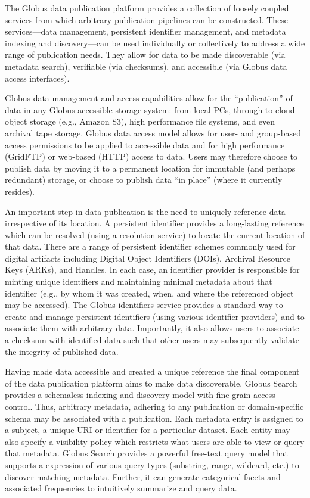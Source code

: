 \documentclass{aip-cp}
\begin{document}
The Globus data publication platform provides a collection of loosely
coupled services from which arbitrary publication pipelines can be constructed. 
These services---data management, persistent identifier management, and 
metadata indexing and discovery---can be used individually or collectively
to address a wide range of publication needs. They allow for data
to be made discoverable (via metadata search), verifiable (via checksums), 
and accessible (via Globus data access interfaces).

Globus data management and access capabilities allow for the 
``publication'' of data in any Globus-accessible storage system: 
from local PCs, through to cloud object storage (e.g., Amazon S3), high performance
file systems, and even archival tape storage. Globus data
access model allows for user- and group-based access permissions
to be applied to accessible data and for high performance (GridFTP)
or web-based (HTTP) access to data. 
Users may therefore
choose to publish data by moving it to a permanent location for 
immutable (and perhaps redundant) storage, or choose to publish 
data ``in place'' (where it currently resides). 

An important step in data publication is the need to uniquely
reference data irrespective of its location. A persistent
identifier provides a long-lasting reference which can be 
resolved (using a resolution service) to locate the current location
of that data. There are a range of persistent identifier schemes
commonly used for digital artifacts including Digital Object
Identifiers (DOIs), Archival Resource Keys (ARKs), and Handles. 
In each case, an identifier provider is responsible for minting
unique identifiers and maintaining minimal metadata about that 
identifier (e.g., by whom it was created, when, and where 
the referenced object may be accessed). The Globus identifiers
service provides a standard way to create and manage persistent
identifiers (using various identifier providers) 
and to associate them with arbitrary data. Importantly, it also
allows users to associate a checksum with identified data
such that other users may subsequently validate the integrity 
of published data. 

Having made data accessible and created a unique reference the
final component of the data publication platform aims to make
data discoverable. Globus Search provides a schemaless 
indexing and discovery model with fine grain access control. 
Thus, arbitrary metadata, adhering to any publication or 
domain-specific schema may be associated with a publication. 
Each metadata entry is assigned to a subject, a unique 
URI or identifier for a particular dataset.  Each entity
may also specify a visibility policy which restricts what
users are able to view or query that metadata. 
Globus Search provides a powerful free-text query model
that supports a expression of various query types (substring, range, wildcard, etc.) 
to discover matching metadata. Further, it can generate
categorical facets and associated frequencies to 
intuitively summarize and query data. 
\end{document}
